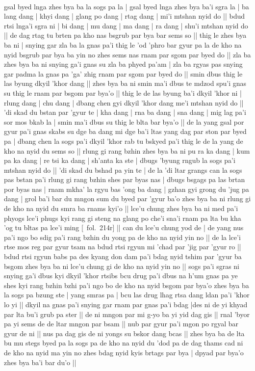 \documentclass[12pt]{article}
\begin{document}
\textbf{\TVA}\\
gsal byed lnga zhes bya ba la sogs pa la | gsal byed lnga zhes bya ba'i sgra la | ba lang dang | khyi dang | glang po dang | rtag dang | mi'i mtshan nyid do || bdud rtsi lnga'i sgra ni | bi dang | mu dang | ma dang | ra dang | shu'i mtshan nyid do || de dag rtag tu brten pa kho nas bsgrub par bya bar sems so || thig le zhes bya ba ni | snying gar zla ba la gnas pa'i thig le 'od 'phro bar gyur pa la de kho na nyid bsgrub par bya ba yin no zhes sems nas rnam par sgom par byed do || zla ba zhes bya ba ni snying ga'i gnas su zla ba phyed pa'am | zla ba rgyas pas snying gar padma la gnas pa 'ga' zhig rnam par sgom par byed do || smin dbus thig le las byung dkyil 'khor dang || zhes bya ba ni smin ma'i dbus te mdzod spu'i gnas su thig le rnam par bsgom par bya'o || thig le de las byung ba'i dkyil 'khor ni | rlung dang | chu dang | dbang chen gyi dkyil 'khor dang me'i mtshan nyid do || 'di skad du bstan par 'gyur te | kha dang | rna ba dang | sna dang | mig lag pa'i sor mos bkab la | smin ma'i dbus su thig le blta bar bya'o || de la yang gsal por gyur pa'i gnas skabs su dge ba dang mi dge ba'i ltas yang dag par ston par byed pa | dbang chen la sogs pa'i dkyil 'khor rab tu bskyed pa'i thig le de la yang de kho na nyid du sems so || rlung gi rang bzhin zhes bya ba ni pu ra ka dang | kum pa ka dang | re tsi ka dang | sh'anta ka ste | dbugs 'byung rngub la sogs pa'i mtshan nyid do || 'di skad du bshad pa yin te | de la 'di ltar grangs can la sogs pas bstan pa'i rlung gi rang bzhin shes par byas nas | dbugs bsgags pa las brtan por byas nas | rnam mkha' la rgyu bas 'ong ba dang | gzhan gyi grong du 'jug pa dang | grol ba'i bar du mngon sum du byed par 'gyur ba'o zhes bya ba ni rlung gi de kho na nyid du smra ba rnams kyi'o || lce'u chung zhes bya ba ni med pa'i phyogs lce'i phugs kyi rang gi steng na glang po che'i sna'i rnam pa lta bu kha 'og tu bltas pa lce'i ming [\TVA\ fol.\ 214r] || can du lce'u chung yod de | de yang nus pa'i ngo bo sdig pa'i rang bzhin du yong pa de kho na nyid yin no || de la lce'i rtse mos reg par gyur tsam na bdud rtsi rgyun mi 'chad par 'jig par 'gyur ro || bdud rtsi rgyun babs pa des kyang don dam pa'i bdag nyid tshim par 'gyur ba bsgom zhes bya ba ni lce'u chung gi de kho na nyid yin no || sogs pa'i sgras ni snying ga'i dbus kyi dkyil 'khor rtsibs bcu drug pa'i dbus na h'um gnas pa ye shes kyi rang bzhin bzhi pa'i ngo bo de kho na nyid bsgom par bya'o zhes bya ba la sogs pa bzung ste | yang smras pa | bcu las drug lhag rtsa dang ldan pa'i 'khor lo yi || dkyil na gnas pa'i snying gar rnam par gnas pa'i bdag  |des ni de yi khyad par lta bu'i grub pa ster || de ni mngon par mi g-yo ba yi yid dag gis || rnal 'byor pa yi sems de de ltar mngon par bsam ||  nub par gyur pa'i mgon po rgyal bar gyur de ni || nus pa dag gis de ni yongs su bskor dang bcas || zhes bya ba de lta bu mu stegs byed pa la sogs pa de kho na nyid du 'dod pa de dag thams cad ni de kho na nyid ma yin no zhes bdag nyid kyis brtags par bya | dpyad par bya'o zhes bya ba'i bar du'o || \\
\end{document}
